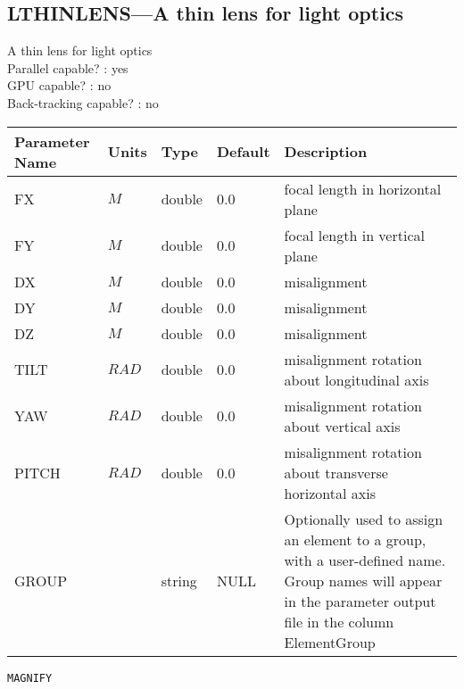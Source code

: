\subsection{LTHINLENS---A thin lens for light optics}
A thin lens for light optics
\\
Parallel capable? : yes\\
GPU capable? : no\\
Back-tracking capable? : no\\
\begin{tabular}{|l|l|l|l|p{\descwidth}|} \hline
Parameter Name & Units & Type & Default & Description \\ \hline 
FX & $M$ & double &  0.0 & focal length in horizontal plane  \\ \hline 
FY & $M$ & double &  0.0 & focal length in vertical plane  \\ \hline 
DX & $M$ & double &  0.0 & misalignment  \\ \hline 
DY & $M$ & double &  0.0 & misalignment  \\ \hline 
DZ & $M$ & double &  0.0 & misalignment  \\ \hline 
TILT & $RAD$ & double &  0.0 & misalignment rotation about longitudinal axis  \\ \hline 
YAW & $RAD$ & double &  0.0 & misalignment rotation about vertical axis  \\ \hline 
PITCH & $RAD$ & double &  0.0 & misalignment rotation about transverse horizontal axis  \\ \hline 
GROUP &  & string & NULL & Optionally used to assign an element to a group, with a user-defined name.  Group names will appear in the parameter output file in the column ElementGroup  \\ \hline 
\end{tabular}

\newpage
\begin{center}{\Large\verb|MAGNIFY|}\end{center}
